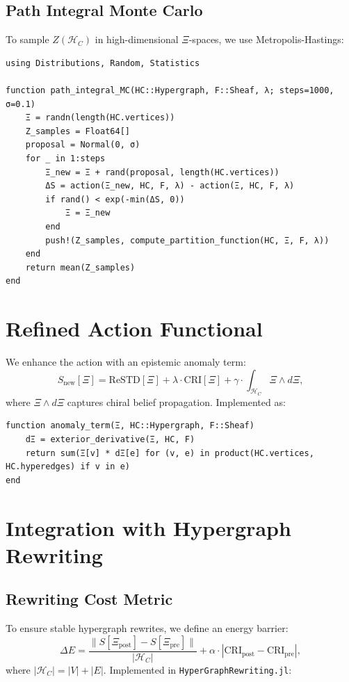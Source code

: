 \documentclass[12pt]{article}
\begin{document}
\subsection{Path Integral Monte Carlo}
To sample \(Z(\mathcal{H}_C)\) in high-dimensional \(\Xi\)-spaces, we use Metropolis-Hastings:

\begin{verbatim}
using Distributions, Random, Statistics

function path_integral_MC(HC::Hypergraph, F::Sheaf, λ; steps=1000, σ=0.1)
    Ξ = randn(length(HC.vertices))
    Z_samples = Float64[]
    proposal = Normal(0, σ)
    for _ in 1:steps
        Ξ_new = Ξ + rand(proposal, length(HC.vertices))
        ΔS = action(Ξ_new, HC, F, λ) - action(Ξ, HC, F, λ)
        if rand() < exp(-min(ΔS, 0))
            Ξ = Ξ_new
        end
        push!(Z_samples, compute_partition_function(HC, Ξ, F, λ))
    end
    return mean(Z_samples)
end
\end{verbatim}

\section{Refined Action Functional}
We enhance the action with an epistemic anomaly term:
\[
S_{\text{new}}[\Xi] = \text{ReSTD}[\Xi] + \lambda \cdot \text{CRI}[\Xi] + \gamma \cdot \int_{\mathcal{H}_C} \Xi \wedge d\Xi,
\]
where \(\Xi \wedge d\Xi\) captures chiral belief propagation. Implemented as:

\begin{verbatim}
function anomaly_term(Ξ, HC::Hypergraph, F::Sheaf)
    dΞ = exterior_derivative(Ξ, HC, F)
    return sum(Ξ[v] * dΞ[e] for (v, e) in product(HC.vertices, HC.hyperedges) if v in e)
end
\end{verbatim}

\section{Integration with Hypergraph Rewriting}
\subsection{Rewriting Cost Metric}
To ensure stable hypergraph rewrites, we define an energy barrier:
\[
\Delta E = \frac{\|S[\Xi_{\text{post}}] - S[\Xi_{\text{pre}}]\|}{|\mathcal{H}_C|} + \alpha \cdot |\text{CRI}_{\text{post}} - \text{CRI}_{\text{pre}}|,
\]
where \(|\mathcal{H}_C| = |V| + |E|\). Implemented in \texttt{HyperGraphRewriting.jl}:
\end{document}
